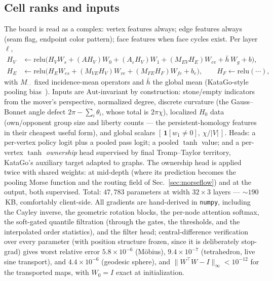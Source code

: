 \documentclass[11pt]{article}
\newcommand{\eps}{\varepsilon}
\newcommand{\Aut}{\mathrm{Aut}}
\begin{document}
\subsection{Cell ranks and inputs}
\label{sec:net}
The board is read as a complex: vertex features always; edge features
always (seam flag, endpoint color pattern); face features when face
cycles exist. Per layer $\ell$,
\begin{align}
H_V &\leftarrow \mathrm{relu}\big(H_V W_s + (A H_V) W_0 + (A_\eps H_V)
W_1 + (M_{EV} H_E) W_{ev} + \bar h\, W_g + b\big),\\
H_E &\leftarrow \mathrm{relu}\big(H_E W_{es} + (M_{VE} H_V) W_{ve} +
(M_{FE} H_F) W_{fe} + b_e\big),\qquad
H_F \leftarrow \mathrm{relu}(\cdots),
\end{align}
with $M_{\cdot\cdot}$ fixed incidence-mean operators and $\bar h$ the
global mean (KataGo-style pooling bias~\cite{wu2019katago}). Inputs are
$\Aut$-invariant by construction: stone/empty indicators from the
mover's perspective, normalized degree, discrete curvature (the
Gauss--Bonnet angle defect $2\pi-\sum_i \theta_i$, whose total is
$2\pi\chi$), localized $H_0$ data (own/opponent group size and liberty
counts --- the persistent-homology features in their cheapest useful
form), and global scalars $[\,\mathbf{1}[w_1\neq 0],\ \chi/|V|\,]$.
Heads: a per-vertex policy logit plus a pooled pass logit; a pooled
$\tanh$ value; and a per-vertex $\tanh$ \emph{ownership} head supervised
by final Tromp--Taylor territory, KataGo's auxiliary target adapted to
graphs. The ownership head is applied twice with shared weights: at mid-depth
(where its prediction becomes the pooling Morse function and the routing
field of Sec.~\ref{sec:morseflow}) and at the
output, both supervised. Total: $47{,}783$ parameters at width
$32\times3$ layers --- $\sim\!190$\,KB, comfortably client-side. All
gradients are hand-derived in \texttt{numpy}, including the Cayley
inverse, the geometric rotation blocks, the per-node attention softmax,
the soft-gated quantile filtration (through the gates, the thresholds,
and the interpolated order statistics), and the filter head;
central-difference verification over every parameter (with position
structure frozen, since it is deliberately stop-grad) gives worst
relative error $5.8\times10^{-6}$ (M\"obius), $9.4\times10^{-7}$
(tetrahedron, live sine transport), and $4.4\times10^{-6}$ (geodesic
sphere), and $\|W^\top W - I\|_\infty < 10^{-12}$ for the transported
maps, with $W_0 = I$ exact at initialization.
\end{document}
